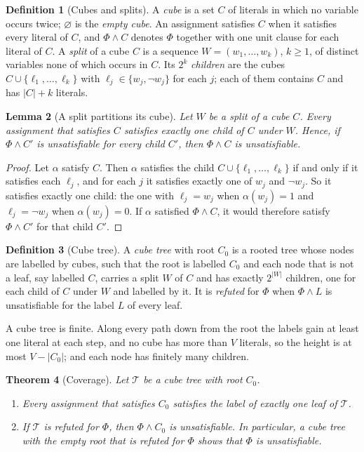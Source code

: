 \documentclass[11pt,reqno]{amsart}
\theoremstyle{plain}
\newtheorem{theorem}{Theorem}[section]
\newtheorem{lemma}[theorem]{Lemma}
\theoremstyle{definition}
\newtheorem{definition}[theorem]{Definition}
\begin{document}
\begin{definition}[Cubes and splits]\label{def:cube}
A \emph{cube} is a set $C$ of literals in which no variable occurs twice; $\varnothing$ is the
\emph{empty cube}. An assignment satisfies $C$ when it satisfies every literal of $C$, and
$\Phi\wedge C$ denotes $\Phi$ together with one unit clause for each literal of $C$. A \emph{split}
of a cube $C$ is a sequence $W=(w_1,\dots,w_k)$, $k\ge1$, of distinct variables none of which
occurs in $C$. Its $2^k$ \emph{children} are the cubes $C\cup\{\ell_1,\dots,\ell_k\}$ with
$\ell_j\in\{w_j,\neg w_j\}$ for each $j$; each of them contains $C$ and has $|C|+k$ literals.
\end{definition}

\begin{lemma}[A split partitions its cube]\label{lem:split}
Let $W$ be a split of a cube $C$. Every assignment that satisfies $C$ satisfies exactly one child
of $C$ under $W$. Hence, if $\Phi\wedge C'$ is unsatisfiable for every child $C'$, then
$\Phi\wedge C$ is unsatisfiable.
\end{lemma}

\begin{proof}
Let $\alpha$ satisfy $C$. Then $\alpha$ satisfies the child $C\cup\{\ell_1,\dots,\ell_k\}$ if and
only if it satisfies each $\ell_j$, and for each $j$ it satisfies exactly one of $w_j$ and
$\neg w_j$. So it satisfies exactly one child: the one with $\ell_j=w_j$ when $\alpha(w_j)=1$ and
$\ell_j=\neg w_j$ when $\alpha(w_j)=0$. If $\alpha$ satisfied $\Phi\wedge C$, it would therefore
satisfy $\Phi\wedge C'$ for that child $C'$.
\end{proof}

\begin{definition}[Cube tree]\label{def:cubetree}
A \emph{cube tree} with root $C_0$ is a rooted tree whose nodes are labelled by cubes, such that
the root is labelled $C_0$ and each node that is not a leaf, say labelled $C$, carries a split $W$
of $C$ and has exactly $2^{|W|}$ children, one for each child of $C$ under $W$ and labelled by it. It
is \emph{refuted} for $\Phi$ when $\Phi\wedge L$ is unsatisfiable for the label $L$ of every leaf.
\end{definition}

A cube tree is finite. Along every path down from the root the labels gain at least one literal
at each step, and no cube has more than $V$ literals, so the height is at most $V-|C_0|$; and each
node has finitely many children.

\begin{theorem}[Coverage]\label{thm:coverage}
Let $\mathcal{T}$ be a cube tree with root $C_0$.
\begin{enumerate}[label=\textup{(\alph*)},leftmargin=2.4em]
\item Every assignment that satisfies $C_0$ satisfies the label of exactly one leaf of
  $\mathcal{T}$.
\item If $\mathcal{T}$ is refuted for $\Phi$, then $\Phi\wedge C_0$ is unsatisfiable. In
  particular, a cube tree with the empty root that is refuted for $\Phi$ shows that $\Phi$ is
  unsatisfiable.
\end{enumerate}
\end{theorem}
\end{document}
